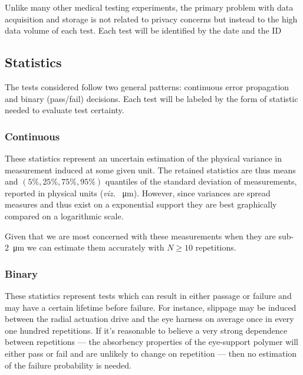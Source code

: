 \documentclass{article}
\begin{document}
Unlike many other medical testing experiments, the primary problem with data acquisition and storage is not related to privacy concerns but instead to the high data volume of each test. Each test will be identified by the date and the ID %

\subsection{Statistics}
\label{sec:statistics}

The tests considered follow two general patterns: continuous error
propagation and binary (pass/fail) decisions. Each test will be
labeled by the form of statistic needed to evaluate test certainty.

\subsubsection{Continuous}
\label{sec:continuous}

These statistics represent an uncertain estimation of the physical variance in measurement induced at some given unit. The retained statistics are thus means and $(5\%, 25\%, 75\%, 95\%)$ quantiles of the standard deviation of measurements, reported in physical units (\textit{viz.} \SI{}{\micro m}). However, since variances are spread measures and thus exist on a exponential support they are best graphically compared on a logarithmic scale.

Given that we are most concerned with these measurements when they are sub-\SI{2}{\micro m} we can estimate them accurately with $N \ge 10$ repetitions.

\subsubsection{Binary}
\label{sec:binary}

These statistics represent tests which can result in either passage or failure and may have a certain lifetime before failure. For instance, slippage may be induced between the radial actuation drive and the eye harness on average once in every one hundred repetitions. If it's reasonable to believe a very strong dependence between repetitions --- the absorbency properties of the eye-support polymer will either pass or fail and are unlikely to change on repetition --- then no estimation of the failure probability is needed.
\end{document}
